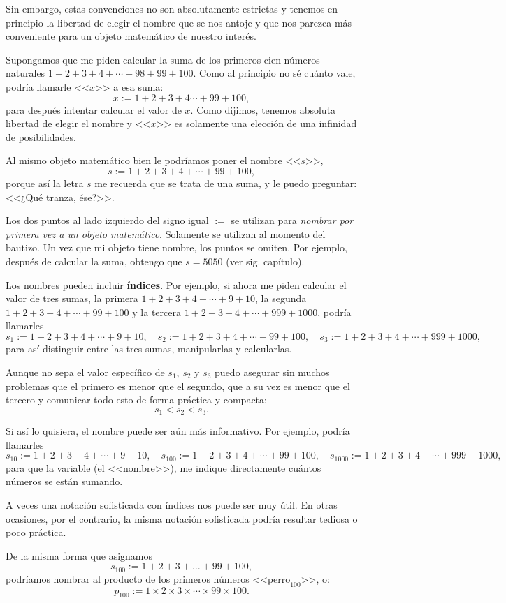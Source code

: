 Sin embargo, estas convenciones no son absolutamente estrictas y tenemos en principio la libertad de elegir el nombre que se nos antoje y que nos parezca más conveniente para un objeto matemático de nuestro interés. 

Supongamos que me piden calcular la suma de los primeros cien números naturales $1+2+3+4+\cdots +98+99+100$. Como al principio no sé cuánto vale, podría llamarle  <<$x$>> a esa suma: $$x:=1+2+3+4\cdots +99+100,$$ para después intentar calcular el valor de $x$. Como dijimos, tenemos absoluta libertad de elegir el nombre y <<$x$>> es solamente una elección de una infinidad de posibilidades.

Al mismo objeto matemático bien le podríamos poner el nombre <<$s$>>, $$s:=1+2+3+4+\cdots+99+100,$$ porque así la letra $s$ me recuerda que se trata de una suma, y le puedo preguntar: <<¿Qué tranza, ése?>>.

Los dos puntos al lado izquierdo del signo igual  $:=$ se utilizan para \emph{nombrar por primera vez a un objeto matemático}. Solamente se utilizan al momento del bautizo. Un vez que mi objeto tiene nombre, los puntos se omiten. Por ejemplo, después de calcular la suma, obtengo que $s=5050$ (ver sig. capítulo).

Los nombres pueden incluir {\bf índices}. Por ejemplo, si ahora me piden calcular el valor de tres sumas, la primera $1+2+3+4+\cdots+9+10$, la segunda $1+2+3+4+\cdots+99+100$ y la tercera $1+2+3+4+\cdots +999+1000$, podría llamarles $$s_1:=1+2+3+4+\cdots+9+10,\quad s_{2}:=1+2+3+4+\cdots+99+100, \quad s_{3}:=1+2+3+4+\cdots +999+1000,$$ para así distinguir entre las tres sumas, manipularlas y calcularlas.

Aunque no sepa el valor específico de $s_1$, $s_2$ y $s_3$ puedo asegurar sin muchos problemas que el primero es menor que el segundo, que a su vez es menor que el tercero y comunicar todo esto de forma práctica y compacta: $$s_1<s_2<s_3.$$

Si así lo quisiera, el nombre puede ser aún más informativo. Por ejemplo, podría llamarles $$s_{10}:=1+2+3+4+\cdots+9+10,\quad s_{100}:=1+2+3+4+\cdots+99+100, \quad s_{1000}:=1+2+3+4+\cdots +999+1000,$$
para que la variable (el <<nombre>>), me indique directamente cuántos números se están sumando.

A veces una notación sofisticada con índices nos puede ser muy útil. En otras ocasiones, por el contrario, la misma notación sofisticada podría resultar tediosa o poco práctica.

De la misma forma que asignamos $$s_{100}:=1+2+3+\dots+99+100,$$ podríamos nombrar al producto de los primeros números <<$\mathrm{perro}_{100}$>>, o: $$p_{100}:=1\times 2\times 3\times \cdots \times 99\times 100.$$

